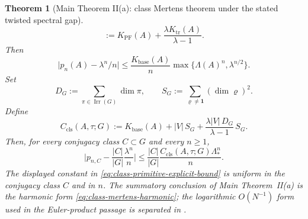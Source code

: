 \documentclass[11pt,a4paper]{amsart}
\theoremstyle{plain}
\newtheorem{theorem}{Theorem}[section]
\theoremstyle{definition}
\theoremstyle{remark}
\DeclareMathOperator{\Irr}{Irr}
\newcommand{\abs}[1]{\lvert #1 \rvert}
\begin{document}
\begin{theorem}[Main Theorem II(a): class Mertens theorem under the
  stated twisted spectral gap]
\[    :=
    K_{\mathrm{PF}}(A)
    +\frac{\lambda K_{\mathrm{tr}}(A)}{\lambda-1}.
  \]
  Then
  \[
    \abs{p_n(A)-\lambda^n/n}
    \le
    \frac{K_{\mathrm{base}}(A)}{n}
      \max\{\Lambda(A)^n,\lambda^{n/2}\}.
  \]
  Set
  \[
    D_G:=\sum_{\pi\in\Irr(G)}\dim\pi,
    \qquad
    S_G:=\sum_{\varrho\neq\mathbf 1}(\dim\varrho)^2.
  \]
  Define
  \begin{equation}\label{eq:class-mertens-explicit-constant}
    C_{\mathrm{cls}}(A,\tau;G)
    :=
    K_{\mathrm{base}}(A)
    +|V|\,S_G
    +\frac{\lambda |V|\,D_G}{\lambda-1}\,S_G.
  \end{equation}
  Then, for every conjugacy class \(C\subset G\) and every \(n\ge 1\),
  \begin{equation}\label{eq:class-primitive-explicit-bound}
    \abs{
      p_{n,C}
      -\frac{|C|}{|G|}\frac{\lambda^n}{n}
    }
    \le
    \frac{|C|}{|G|}
    \frac{C_{\mathrm{cls}}(A,\tau;G)\Lambda_*^n}{n}.
  \end{equation}
  The displayed constant in
  \eqref{eq:class-primitive-explicit-bound} is uniform in the conjugacy
  class \(C\) and in \(n\).  The summatory conclusion of Main
  Theorem~II(a) is the harmonic form
  \eqref{eq:class-mertens-harmonic}; the logarithmic \(O(N^{-1})\)
  form used in the Euler-product passage is separated in
  .
\end{theorem}
\end{document}
